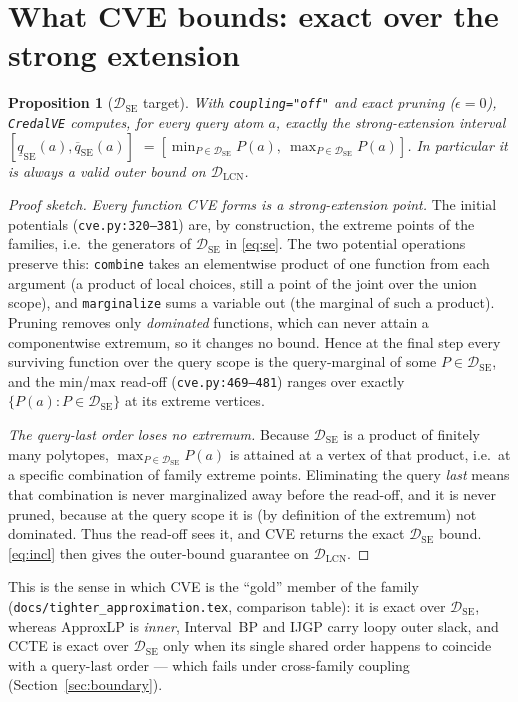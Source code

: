 \documentclass[11pt]{article}
\newtheorem{proposition}{Proposition}
\newcommand{\lo}{\underline}
\newcommand{\hi}{\overline}
\newcommand{\DSE}{\mathcal{D}_{\mathrm{SE}}}
\newcommand{\DLCN}{\mathcal{D}_{\mathrm{LCN}}}
\newcommand{\CVE}{\texttt{CredalVE}}
\begin{document}
\section{What CVE bounds: exact over the strong extension}\label{sec:bounds}

\begin{proposition}[$\DSE$ target]\label{prop:se}
With \texttt{coupling="off"} and exact pruning ($\epsilon=0$), \CVE{} computes, for every query atom
$a$, exactly the strong-extension interval
$[\lo q_{\mathrm{SE}}(a),\hi q_{\mathrm{SE}}(a)]$
$=[\min_{P\in\DSE}P(a),\ \max_{P\in\DSE}P(a)]$. In particular it is always a valid \emph{outer}
bound on $\DLCN$.
\end{proposition}

\begin{proof}[Proof sketch]
\emph{Every function CVE forms is a strong-extension point.} The initial potentials
(\texttt{cve.py:320--381}) are, by construction, the extreme points of the families, i.e.\ the
generators of $\DSE$ in \eqref{eq:se}. The two potential operations preserve this: \texttt{combine}
takes an elementwise product of one function from each argument (a product of local choices, still a
point of the joint over the union scope), and \texttt{marginalize} sums a variable out (the marginal
of such a product). Pruning removes only \emph{dominated} functions, which can never attain a
componentwise extremum, so it changes no bound. Hence at the final step every surviving function
over the query scope is the query-marginal of some $P\in\DSE$, and the min/max read-off
(\texttt{cve.py:469--481}) ranges over exactly $\{P(a):P\in\DSE\}$ at its extreme vertices.

\emph{The query-last order loses no extremum.} Because $\DSE$ is a product of finitely many
polytopes, $\max_{P\in\DSE}P(a)$ is attained at a vertex of that product, i.e.\ at a specific
combination of family extreme points. Eliminating the query \emph{last} means that combination is
never marginalized away before the read-off, and it is never pruned, because at the query scope it
is (by definition of the extremum) not dominated. Thus the read-off sees it, and CVE returns the
exact $\DSE$ bound. \eqref{eq:incl} then gives the outer-bound guarantee on $\DLCN$.
\end{proof}

\noindent This is the sense in which CVE is the ``gold'' member of the family
(\texttt{docs/tighter\_approximation.tex}, comparison table): it is exact over $\DSE$, whereas
ApproxLP is \emph{inner}, Interval~BP and IJGP carry loopy outer slack, and CCTE is exact over $\DSE$
only when its single shared order happens to coincide with a query-last order --- which fails under
cross-family coupling (Section~\ref{sec:boundary}).
\end{document}
